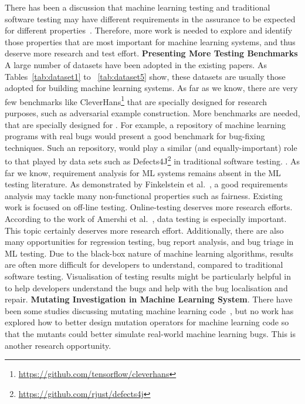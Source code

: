 There has been a discussion that machine learning testing and traditional software testing may have different requirements in the assurance to be expected for different properties~. 
Therefore, more work is needed to explore and identify those properties that are most important for machine learning systems, and thus deserve more research and test effort.
\noindent\textbf{Presenting More Testing Benchmarks}
A large number of datasets have been adopted in the existing \mlt{} papers.
As Tables~\ref{tab:dataset1} to ~\ref{tab:dataset5} show, these datasets are usually those adopted for building machine learning systems. 
As far as we know, there are very few benchmarks like CleverHans\footnote{\url{https://github.com/tensorflow/cleverhans}} that are specially designed for \mlt{} research purposes, such as adversarial example construction.
More benchmarks are needed, that are specially designed for \mlt{}.
For example, a repository of machine learning programs with real bugs would present a good benchmark for bug-fixing techniques.
Such an \mlt{} repository, would play a similar (and equally-important) role to that played by data sets such as Defects4J\footnote{\url{https://github.com/rjust/defects4j}} in traditional software testing.
\noindent\textbf{}.
As far we know, requirement analysis for ML systems remains absent in the ML testing literature.
As demonstrated by Finkelstein et al.~, a good requirements analysis may tackle many non-functional properties such as fairness. 
Existing work is focused on off-line testing. 
Online-testing deserves more research efforts.
According to the work of Amershi et al.~, data testing is especially important.
This topic certainly deserves more research effort.
Additionally, there are also many opportunities for regression testing, bug report analysis, and bug triage in ML testing.
Due to the black-box nature of machine learning algorithms, \mlt{} results are often more difficult for developers to understand, compared to traditional software testing.
Visualisation of testing results might be particularly helpful in \mlt{} to help developers understand the bugs and help with the bug localisation and repair. 
\noindent\textbf{Mutating Investigation in Machine Learning System}.
There have been some studies discussing mutating machine learning code~, but no work has explored how to better design mutation operators for machine learning code so that the mutants could better simulate real-world machine learning bugs.
This is another research opportunity.

